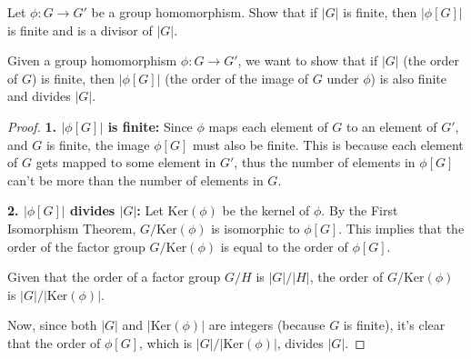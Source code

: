 \documentclass[12pt]{amsart}
\theoremstyle{definition}
\numberwithin{equation}{section}
\theoremstyle{plain}
\begin{document}
\begin{exercise}{44} Let $\phi  : G \rightarrow G'$ be a group homomorphism. Show that if $|G|$ is finite, then $|\phi[G]|$ is finite and is a divisor
    of $|G|$.
    
    Given a group homomorphism \( \phi : G \rightarrow G' \), we want to show that if \( |G| \) (the order of \( G \)) is finite, then \( |\phi[G]| \) (the order of the image of \( G \) under \( \phi \)) is also finite and divides \( |G| \).
    
    \begin{proof}
\textbf{1. \( |\phi[G]| \) is finite:}  
Since \( \phi \) maps each element of \( G \) to an element of \( G' \), and \( G \) is finite, the image \( \phi[G] \) must also be finite. This is because each element of \( G \) gets mapped to some element in \( G' \), thus the number of elements in \( \phi[G] \) can't be more than the number of elements in \( G \).

\textbf{2. \( |\phi[G]| \) divides \( |G| \):}  
Let \( \text{Ker}(\phi) \) be the kernel of \( \phi \). By the First Isomorphism Theorem, \( G/\text{Ker}(\phi) \) is isomorphic to \( \phi[G] \). This implies that the order of the factor group \( G/\text{Ker}(\phi) \) is equal to the order of \( \phi[G] \).

Given that the order of a factor group \( G/H \) is \( |G|/|H| \), the order of \( G/\text{Ker}(\phi) \) is \( |G|/|\text{Ker}(\phi)| \).

Now, since both \( |G| \) and \( |\text{Ker}(\phi)| \) are integers (because \( G \) is finite), it's clear that the order of \( \phi[G] \), which is \( |G|/|\text{Ker}(\phi)| \), divides \( |G| \).
    \end{proof}
\end{exercise}
\vspace*{20pt}
\end{document}
